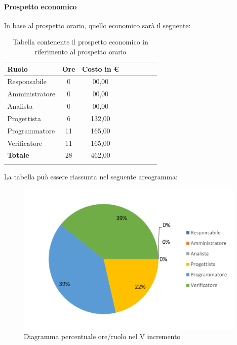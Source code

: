 \paragraph{Prospetto economico}
In base al prospetto orario, quello economico sarà il seguente:

\begin{longtable}{|l|c|c|c|c|c|c|c|}
	\hline
	\rowcolor{lighter-grayer}
	\textbf{Ruolo}  & \textbf{Ore} & \textbf{Costo in €} \\
	\hline
	\endfirsthead

	\hline
	Responsabile    & 0            & 00,00              \\
	\hline
	\hline
	Amministratore  & 0           & 00,00              \\
	\hline
	\hline
	Analista        & 0           & 00,00              \\
	\hline
	\hline
	Progettista     & 6            & 132,00                   \\
	\hline
	\hline
	Programmatore   & 11            & 165,00                   \\
	\hline
	\hline
	Verificatore    & 11           & 165,00              \\
	\hline
	\hline
	\textbf{Totale} & 28           & 462,00            \\
	\hline
	\rowcolor{white}
	\caption{Tabella contenente il prospetto economico in riferimento al prospetto orario}
\end{longtable}
\pagebreak

La tabella può essere riassunta nel seguente areogramma:
\begin{figure}[H]
	\centering
	\includegraphics[width=0.8\linewidth]{res/images/preventivo/dettaglio_implementazione/2-2.png}
	\caption{Diagramma percentuale ore/ruolo nel V incremento}
	\label{fig:diagramma costi ruolo V incremento}
\end{figure}


